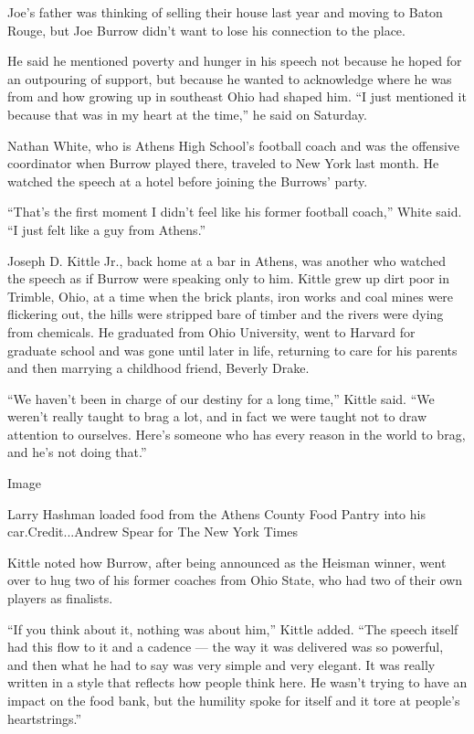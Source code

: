 Joe's father was thinking of selling their house last year and moving to
Baton Rouge, but Joe Burrow didn't want to lose his connection to the
place.

He said he mentioned poverty and hunger in his speech not because he
hoped for an outpouring of support, but because he wanted to acknowledge
where he was from and how growing up in southeast Ohio had shaped him.
``I just mentioned it because that was in my heart at the time,'' he
said on Saturday.

Nathan White, who is Athens High School's football coach and was the
offensive coordinator when Burrow played there, traveled to New York
last month. He watched the speech at a hotel before joining the Burrows'
party.

``That's the first moment I didn't feel like his former football
coach,'' White said. ``I just felt like a guy from Athens.''

Joseph D. Kittle Jr., back home at a bar in Athens, was another who
watched the speech as if Burrow were speaking only to him. Kittle grew
up dirt poor in Trimble, Ohio, at a time when the brick plants, iron
works and coal mines were flickering out, the hills were stripped bare
of timber and the rivers were dying from chemicals. He graduated from
Ohio University, went to Harvard for graduate school and was gone until
later in life, returning to care for his parents and then marrying a
childhood friend, Beverly Drake.

``We haven't been in charge of our destiny for a long time,'' Kittle
said. ``We weren't really taught to brag a lot, and in fact we were
taught not to draw attention to ourselves. Here's someone who has every
reason in the world to brag, and he's not doing that.''

Image

Larry Hashman loaded food from the Athens County Food Pantry into his
car.Credit...Andrew Spear for The New York Times

Kittle noted how Burrow, after being announced as the Heisman winner,
went over to hug two of his former coaches from Ohio State, who had two
of their own players as finalists.

``If you think about it, nothing was about him,'' Kittle added. ``The
speech itself had this flow to it and a cadence --- the way it was
delivered was so powerful, and then what he had to say was very simple
and very elegant. It was really written in a style that reflects how
people think here. He wasn't trying to have an impact on the food bank,
but the humility spoke for itself and it tore at people's
heartstrings.''

